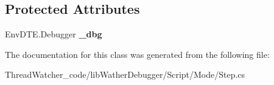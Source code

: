 \subsection*{Protected Attributes}
\begin{DoxyCompactItemize}
\item 
\hypertarget{classlib_wather_debugger_1_1_script_1_1_mode_1_1_step_adcdc82aea5594724e693e688393aedf4}{Env\+D\+T\+E.\+Debugger {\bfseries \+\_\+dbg}}\label{classlib_wather_debugger_1_1_script_1_1_mode_1_1_step_adcdc82aea5594724e693e688393aedf4}

\end{DoxyCompactItemize}


The documentation for this class was generated from the following file\+:\begin{DoxyCompactItemize}
\item 
Thread\+Watcher\+\_\+code/lib\+Wather\+Debugger/\+Script/\+Mode/Step.\+cs\end{DoxyCompactItemize}
